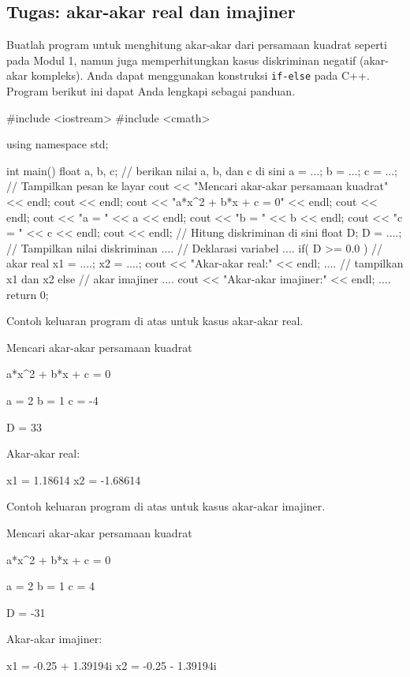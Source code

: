 \documentclass[a4paper,11pt]{extarticle}
\begin{document}
\subsection{Tugas: akar-akar real dan imajiner}

Buatlah program untuk menghitung akar-akar dari persamaan kuadrat
seperti pada Modul 1, namun juga memperhitungkan kasus diskriminan negatif
(akar-akar kompleks).
Anda dapat menggunakan konstruksi \texttt{if-else} pada C++.
Program berikut ini dapat Anda lengkapi sebagai panduan.

\begin{cppcode}
#include <iostream>
#include <cmath>

using namespace std;

int main()
{
  float a, b, c;
  // berikan nilai a, b, dan c di sini
  a = ...;
  b = ...;
  c = ...;
  // Tampilkan pesan ke layar
  cout << "Mencari akar-akar persamaan kuadrat" << endl;
  cout << endl;
  cout << "a*x^2 + b*x + c = 0" << endl;
  cout << endl;
  cout << "a = " << a << endl;
  cout << "b = " << b << endl;
  cout << "c = " << c << endl;
  cout << endl;
  // Hitung diskriminan di sini
  float D;
  D = ....;
  // Tampilkan nilai diskriminan
  ....
  // Deklarasi variabel
  ....
  if( D >= 0.0 ) { // akar real
    x1 = ....;
    x2 = ....;
    cout << "Akar-akar real:" << endl;
    .... // tampilkan x1 dan x2
  }
  else { // akar imajiner
    ....
    cout << "Akar-akar imajiner:" << endl;
    ....
  }
  return 0;
}
\end{cppcode}

Contoh keluaran program di atas untuk kasus akar-akar real.
\begin{textcode}
Mencari akar-akar persamaan kuadrat

a*x^2 + b*x + c = 0

a = 2
b = 1
c = -4

D = 33

Akar-akar real:

x1 = 1.18614
x2 = -1.68614
\end{textcode}

Contoh keluaran program di atas untuk kasus akar-akar imajiner.
\begin{textcode}
Mencari akar-akar persamaan kuadrat

a*x^2 + b*x + c = 0

a = 2
b = 1
c = 4

D = -31

Akar-akar imajiner:

x1 = -0.25 + 1.39194i
x2 = -0.25 - 1.39194i
\end{textcode}
\end{document}
